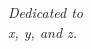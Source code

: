 \clearpage
\null\vfill
\begin{flushright}
    \textit{Dedicated to \\
    x, y, and z.}
\end{flushright}
\vfill